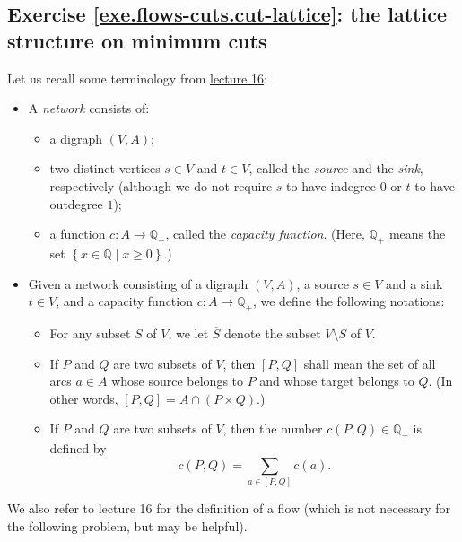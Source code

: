 \documentclass[numbers=enddot,12pt,final,onecolumn,notitlepage]{scrartcl}%
\theoremstyle{definition}
\let\sumnonlimits\sum
\renewcommand{\sum}{\sumnonlimits\limits}
\newcommand{\QQ}{\mathbb{Q}}
\newcommand{\set}[1]{\left\{ #1 \right\}}
\newcommand{\tup}[1]{\left( #1 \right)}
\newcommand{\ive}[1]{\left[ #1 \right]}
\begin{document}
\subsection{Exercise \ref{exe.flows-cuts.cut-lattice}: the
lattice structure on minimum cuts}

Let us recall some terminology from
\href{http://www-users.math.umn.edu/~dgrinber/5707s17/5707lec16.pdf}{lecture 16}:

\begin{itemize}
\item A \textit{network} consists of:
      \begin{itemize}
      \item a digraph $\tup{V, A}$;
      \item two distinct vertices $s \in V$ and $t \in V$,
            called the \textit{source} and the \textit{sink},
            respectively (although we do not require $s$ to
            have indegree $0$ or $t$ to have outdegree $1$);
      \item a function $c : A \to \QQ_+$, called the
            \textit{capacity function}.
            (Here, $\QQ_+$ means the set
            $\set{ x \in \QQ \mid x \geq 0 }$.)
      \end{itemize}

\item Given a network consisting of a digraph
      $\tup{V, A}$, a source $s \in V$ and a sink $t \in V$,
      and a capacity function $c : A \to \QQ_+$, we define
      the following notations:
      \begin{itemize}
      \item For any subset $S$ of $V$, we let $\overline{S}$
            denote the subset $V \setminus S$ of $V$.
      \item If $P$ and $Q$ are two subsets of $V$, then
            $\ive{P, Q}$ shall mean the set of all arcs
            $a \in A$ whose source belongs to $P$ and whose
            target belongs to $Q$.
            (In other words,
            $\ive{P, Q} = A \cap \tup{P \times Q}$.)
      \item If $P$ and $Q$ are two subsets of $V$, then the
            number $c \tup{P, Q} \in \QQ_+$ is defined by
            \[
            c \tup{P, Q} = \sum_{a \in \ive{P, Q}} c \tup{a} .
            \]
      \end{itemize}
\end{itemize}

We also refer to lecture 16 for the definition of a flow
(which is not necessary for the following problem, but may
be helpful).
\end{document}
